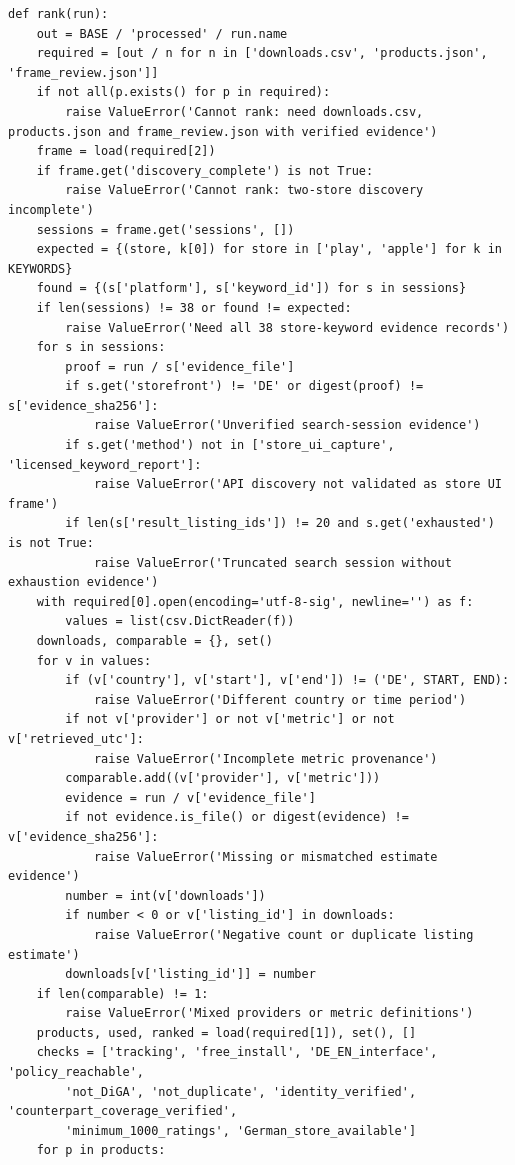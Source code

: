 \documentclass[10pt,a4paper]{article}
\begin{document}
\begin{lstlisting}
def rank(run):
    out = BASE / 'processed' / run.name
    required = [out / n for n in ['downloads.csv', 'products.json', 'frame_review.json']]
    if not all(p.exists() for p in required):
        raise ValueError('Cannot rank: need downloads.csv, products.json and frame_review.json with verified evidence')
    frame = load(required[2])
    if frame.get('discovery_complete') is not True:
        raise ValueError('Cannot rank: two-store discovery incomplete')
    sessions = frame.get('sessions', [])
    expected = {(store, k[0]) for store in ['play', 'apple'] for k in KEYWORDS}
    found = {(s['platform'], s['keyword_id']) for s in sessions}
    if len(sessions) != 38 or found != expected:
        raise ValueError('Need all 38 store-keyword evidence records')
    for s in sessions:
        proof = run / s['evidence_file']
        if s.get('storefront') != 'DE' or digest(proof) != s['evidence_sha256']:
            raise ValueError('Unverified search-session evidence')
        if s.get('method') not in ['store_ui_capture', 'licensed_keyword_report']:
            raise ValueError('API discovery not validated as store UI frame')
        if len(s['result_listing_ids']) != 20 and s.get('exhausted') is not True:
            raise ValueError('Truncated search session without exhaustion evidence')
    with required[0].open(encoding='utf-8-sig', newline='') as f:
        values = list(csv.DictReader(f))
    downloads, comparable = {}, set()
    for v in values:
        if (v['country'], v['start'], v['end']) != ('DE', START, END):
            raise ValueError('Different country or time period')
        if not v['provider'] or not v['metric'] or not v['retrieved_utc']:
            raise ValueError('Incomplete metric provenance')
        comparable.add((v['provider'], v['metric']))
        evidence = run / v['evidence_file']
        if not evidence.is_file() or digest(evidence) != v['evidence_sha256']:
            raise ValueError('Missing or mismatched estimate evidence')
        number = int(v['downloads'])
        if number < 0 or v['listing_id'] in downloads:
            raise ValueError('Negative count or duplicate listing estimate')
        downloads[v['listing_id']] = number
    if len(comparable) != 1:
        raise ValueError('Mixed providers or metric definitions')
    products, used, ranked = load(required[1]), set(), []
    checks = ['tracking', 'free_install', 'DE_EN_interface', 'policy_reachable',
        'not_DiGA', 'not_duplicate', 'identity_verified', 'counterpart_coverage_verified',
        'minimum_1000_ratings', 'German_store_available']
    for p in products:

\end{lstlisting}
\end{document}
